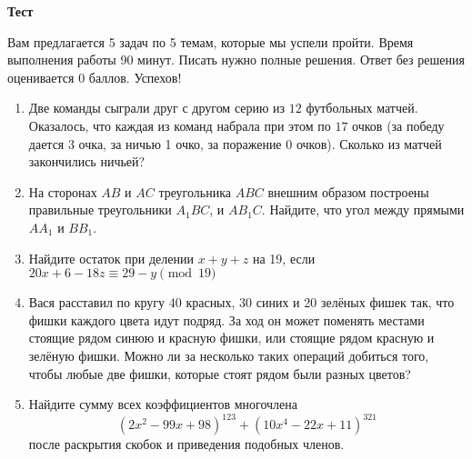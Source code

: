 \documentclass{article}
\begin{document}
    \large


    \begin{center}
        \textbf{Тест}
    \end{center}

    Вам предлагается 5 задач по 5 темам, которые мы успели пройти.
    Время выполнения работы 90 минут.
    Писать нужно полные решения.
    Ответ без решения оценивается 0 баллов.
    Успехов!

    \begin{enumerate}[label*=\arabic{enumi}.]

        \item Две команды сыграли друг с другом серию из $12$ футбольных матчей.
        Оказалось, что каждая из команд набрала при этом по $17$ очков (за победу дается 3 очка, за ничью 1 очко, за поражение 0 очков).
        Сколько из матчей закончились ничьей?

        \item На сторонах $AB$ и $AC$ треугольника $ABC$ внешним образом построены правильные треугольники $A_{1}BC$, и $AB_{1}C$.
        Найдите, что угол между прямыми $AA_1$ и $BB_1$.

        \item Найдите остаток при делении $x + y + z$ на 19, если $20x + 6 - 18z \equiv 29 - y \pmod 19$

        \item Вася расставил по кругу 40 красных, 30 синих и 20 зелёных фишек так, что фишки каждого цвета идут подряд.
        За ход он может поменять местами стоящие рядом синюю и красную фишки, или стоящие рядом красную и зелёную фишки.
        Можно ли за несколько таких операций добиться того, чтобы любые две фишки, которые стоят рядом были разных цветов?

        \item Найдите сумму всех коэффициентов многочлена \[(2x^2 - 99x + 98)^{123} + (10x^4 - 22x + 11)^{321}\] после раскрытия скобок и приведения подобных членов.


    \end{enumerate}
\end{document}
